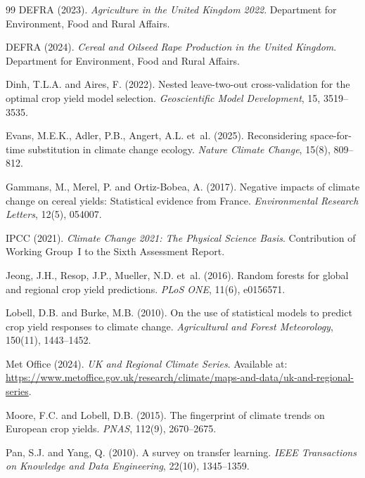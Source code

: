 \documentclass[12pt,a4paper]{report}
\begin{document}
\begin{thebibliography}{99}
DEFRA (2023).
\newblock \emph{Agriculture in the United Kingdom 2022}.
\newblock Department for Environment, Food and Rural Affairs.

DEFRA (2024).
\newblock \emph{Cereal and Oilseed Rape Production in the United Kingdom}.
\newblock Department for Environment, Food and Rural Affairs.

Dinh, T.L.A. and Aires, F. (2022).
\newblock Nested leave-two-out cross-validation for the optimal crop yield model selection.
\newblock \emph{Geoscientific Model Development}, 15, 3519--3535.

Evans, M.E.K., Adler, P.B., Angert, A.L. et~al. (2025).
\newblock Reconsidering space-for-time substitution in climate change ecology.
\newblock \emph{Nature Climate Change}, 15(8), 809--812.

Gammans, M., Merel, P. and Ortiz-Bobea, A. (2017).
\newblock Negative impacts of climate change on cereal yields: Statistical evidence from France.
\newblock \emph{Environmental Research Letters}, 12(5), 054007.

IPCC (2021).
\newblock \emph{Climate Change 2021: The Physical Science Basis}.
\newblock Contribution of Working Group~I to the Sixth Assessment Report.

Jeong, J.H., Resop, J.P., Mueller, N.D. et~al. (2016).
\newblock Random forests for global and regional crop yield predictions.
\newblock \emph{PLoS ONE}, 11(6), e0156571.

Lobell, D.B. and Burke, M.B. (2010).
\newblock On the use of statistical models to predict crop yield responses to climate change.
\newblock \emph{Agricultural and Forest Meteorology}, 150(11), 1443--1452.

Met Office (2024).
\newblock \emph{UK and Regional Climate Series}.
\newblock Available at: \url{https://www.metoffice.gov.uk/research/climate/maps-and-data/uk-and-regional-series}.

Moore, F.C. and Lobell, D.B. (2015).
\newblock The fingerprint of climate trends on European crop yields.
\newblock \emph{PNAS}, 112(9), 2670--2675.

Pan, S.J. and Yang, Q. (2010).
\newblock A survey on transfer learning.
\newblock \emph{IEEE Transactions on Knowledge and Data Engineering}, 22(10), 1345--1359.


\end{thebibliography}
\end{document}
